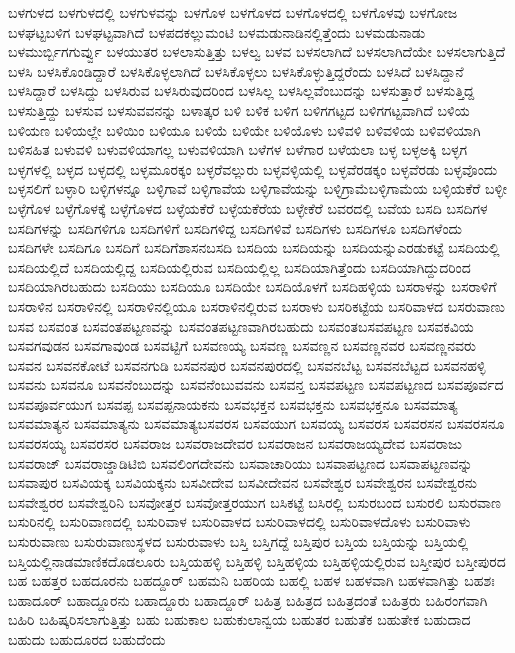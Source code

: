 {ಬಳಗುಳದ
ಬಳಗುಳದಲ್ಲಿ
ಬಳಗುಳವನ್ನು
ಬಳಗೊಳ
ಬಳಗೊಳದ
ಬಳಗೊಳದಲ್ಲಿ
ಬಳಗೊಳವು
ಬಳಗೋಜ
ಬಳಘಟ್ಟಬಳಿಗ
ಬಳಘಟ್ಟವಾಗಿದೆ
ಬಳಪದಕಲ್ಲುಮಂಟಿ
ಬಳಮಡುನಾಡಿನಲ್ಲಿತ್ತೆಂದು
ಬಳಮಡುನಾಡು
ಬಳಮುರ್ಬ್ಬಿಗಗುರ್ವ್ವು
ಬಳಯುತರ
ಬಳಲಾಸುತ್ತಿತ್ತು
ಬಳಲ್ವ
ಬಳವ
ಬಳಸಲಾಗಿದೆ
ಬಳಸಲಾಗಿದೆಯೇ
ಬಳಸಲಾಗುತ್ತಿದೆ
ಬಳಸಿ
ಬಳಸಿಕೊಂಡಿದ್ದಾರೆ
ಬಳಸಿಕೊಳ್ಳಲಾಗಿದೆ
ಬಳಸಿಕೊಳ್ಳಲು
ಬಳಸಿಕೊಳ್ಳುತ್ತಿದ್ದರೆಂದು
ಬಳಸಿದೆ
ಬಳಸಿದ್ದಾನೆ
ಬಳಸಿದ್ದಾರೆ
ಬಳಸಿದ್ದು
ಬಳಸಿರುವ
ಬಳಸಿರುವುದರಿಂದ
ಬಳಸಿಲ್ಲ
ಬಳಸಿಲ್ಲವೆಂಬುದನ್ನು
ಬಳಸುತ್ತಾರೆ
ಬಳಸುತ್ತಿದ್ದ
ಬಳಸುತ್ತಿದ್ದು
ಬಳಸುವ
ಬಳಸುವವನನ್ನು
ಬಳಾತ್ಕರ
ಬಳಿ
ಬಳಿಕ
ಬಳಿಗ
ಬಳಿಗಗಟ್ಟದ
ಬಳಿಗಗಟ್ಟವಾಗಿದೆ
ಬಳಿಯ
ಬಳಿಯಣ
ಬಳಿಯಲ್ಲೇ
ಬಳಿಯಿಂ
ಬಳಿಯೂ
ಬಳಿಯೆ
ಬಳಿಯೇ
ಬಳಿಯೊಳು
ಬಳಿವಳಿ
ಬಳಿವಳಿಯ
ಬಳಿವಳಿಯಾಗಿ
ಬಳಿಸಹಿತ
ಬಳುವಳಿ
ಬಳುವಳಿಯಾಗಲ್ಲ
ಬಳುವಳಿಯಾಗಿ
ಬಳೆಗಳ
ಬಳೆಗಾರ
ಬಳೆಯಲಾ
ಬಳ್ಳ
ಬಳ್ಳಅಕ್ಕಿ
ಬಳ್ಳಗ
ಬಳ್ಳಗಳಲ್ಲಿ
ಬಳ್ಳದ
ಬಳ್ಳದಲ್ಲಿ
ಬಳ್ಳಮೂರಕ್ಕಂ
ಬಳ್ಳರೆವಲ್ಲುರು
ಬಳ್ಳವಳ್ಳಿಯಲ್ಲಿ
ಬಳ್ಳವೆರಡಕ್ಕಂ
ಬಳ್ಳವೆರಡು
ಬಳ್ಳವೊಂದು
ಬಳ್ಳಸಲಿಗೆ
ಬಳ್ಳಾರಿ
ಬಳ್ಳಿಗಳನ್ನೂ
ಬಳ್ಳಿಗಾವೆ
ಬಳ್ಳಿಗಾವೆಯ
ಬಳ್ಳಿಗಾವೆಯನ್ನು
ಬಳ್ಳಿಗ್ರಾಮೆಬಳ್ಳಿಗಾಮೆಯ
ಬಳ್ಳಿಯಕೆರೆ
ಬಳ್ಳೀ
ಬಳ್ಳೆಗೊಳ
ಬಳ್ಳೆಗೊಳಕ್ಕೆ
ಬಳ್ಳೆಗೊಳದ
ಬಳ್ಳೆಯಕೆರೆ
ಬಳ್ಳೆಯಕೆರೆಯ
ಬಳ್ಳೇಕೆರೆ
ಬವರದಲ್ಲಿ
ಬವೆಯ
ಬಸದಿ
ಬಸದಿಗಳ
ಬಸದಿಗಳನ್ನು
ಬಸದಿಗಳಿಗೂ
ಬಸದಿಗಳಿಗೆ
ಬಸದಿಗಳಿದ್ದ
ಬಸದಿಗಳಿವೆ
ಬಸದಿಗಳು
ಬಸದಿಗಳೂ
ಬಸದಿಗಳೆಂದು
ಬಸದಿಗಳೇ
ಬಸದಿಗೂ
ಬಸದಿಗೆ
ಬಸದಿಗೆಶಾಸನಬಸದಿ
ಬಸದಿಯ
ಬಸದಿಯನ್ನು
ಬಸದಿಯನ್ನುಎರಡುಕಟ್ಟೆ
ಬಸದಿಯಲ್ಲಿ
ಬಸದಿಯಲ್ಲಿದೆ
ಬಸದಿಯಲ್ಲಿದ್ದ
ಬಸದಿಯಲ್ಲಿರುವ
ಬಸದಿಯಲ್ಲಿಲ್ಲ
ಬಸದಿಯಾಗಿತ್ತೆಂದು
ಬಸದಿಯಾಗಿದ್ದುದರಿಂದ
ಬಸದಿಯಾಗಿರಬಹುದು
ಬಸದಿಯು
ಬಸದಿಯೂ
ಬಸದಿಯೇ
ಬಸದಿಯೊಳಗೆ
ಬಸದಿಹಳ್ಳಿಯ
ಬಸರಾಳನ್ನು
ಬಸರಾಳಿಗೆ
ಬಸರಾಳಿನ
ಬಸರಾಳಿನಲ್ಲಿ
ಬಸರಾಳಿನಲ್ಲಿಯೂ
ಬಸರಾಳಿನಲ್ಲಿರುವ
ಬಸರಾಳು
ಬಸರಿಕಟ್ಟೆಯ
ಬಸರಿವಾಳದ
ಬಸರುವಾಣು
ಬಸವ
ಬಸವಂತ
ಬಸವಂತಪಟ್ಟಣವನ್ನು
ಬಸವಂತಪಟ್ಟಣವಾಗಿರಬಹುದು
ಬಸವಂತಬಸವಪಟ್ಟಣ
ಬಸವಕವಿಯ
ಬಸವಗವುಡನ
ಬಸವಗಾವುಂಡ
ಬಸವಟ್ಟಿಗೆ
ಬಸವಣಯ್ಯ
ಬಸವಣ್ಣ
ಬಸವಣ್ಣನ
ಬಸವಣ್ಣನವರ
ಬಸವಣ್ಣನವರು
ಬಸವನ
ಬಸವನಕೋಟೆ
ಬಸವನಗುಡಿ
ಬಸವನಪುರ
ಬಸವನಪುರದಲ್ಲಿ
ಬಸವನಬೆಟ್ಟ
ಬಸವನಬೆಟ್ಟದ
ಬಸವನಹಳ್ಳಿ
ಬಸವನು
ಬಸವನೂ
ಬಸವನೆಂಬುದನ್ನು
ಬಸವನೆಂಬುವವನು
ಬಸವನ್ತ
ಬಸವಪಟ್ಟಣ
ಬಸವಪಟ್ಟಣದ
ಬಸವಪೂರ್ವದ
ಬಸವಪೂರ್ವಯುಗ
ಬಸವಪ್ಪ
ಬಸವಪ್ಪನಾಯಕನು
ಬಸವಭಕ್ತನ
ಬಸವಭಕ್ತನು
ಬಸವಭಕ್ತನೂ
ಬಸವಮಾತ್ಯ
ಬಸವಮಾತ್ಯನ
ಬಸವಮಾತ್ಯನು
ಬಸವಮಾತ್ಯಬಸವರಸ
ಬಸವಯುಗ
ಬಸವಯ್ಯ
ಬಸವರಸ
ಬಸವರಸನ
ಬಸವರಸನೂ
ಬಸವರಸಯ್ಯ
ಬಸವರಸರ
ಬಸವರಾಜ
ಬಸವರಾಜದೇವರ
ಬಸವರಾಜನ
ಬಸವರಾಜಯ್ಯದೇವ
ಬಸವರಾಜು
ಬಸವರಾಜ್
ಬಸವರಾಜ್ಡಾಡಿಟಿಬಿ
ಬಸವಲಿಂಗದೇವನು
ಬಸವಾಚಾರಿಯು
ಬಸವಾಪಟ್ಟಣದ
ಬಸವಾಪಟ್ಟಣವನ್ನು
ಬಸವಾಪುರ
ಬಸವಿಯಕ್ಕ
ಬಸವಿಯಕ್ಕನು
ಬಸವೀದೇವ
ಬಸವೀದೇವನ
ಬಸವೇಶ್ವರ
ಬಸವೇಶ್ವರನ
ಬಸವೇಶ್ವರನು
ಬಸವೇಶ್ವರರ
ಬಸವೇಶ್ವರಿನಿ
ಬಸವೋತ್ತರ
ಬಸವೋತ್ತರಯುಗ
ಬಸಿಕಟ್ಟೆ
ಬಸಿರಲ್ಲಿ
ಬಸುರಬಂದ
ಬಸುರಲಿ
ಬಸುರವಾಣ
ಬಸುರಿನಲ್ಲಿ
ಬಸುರಿವಾಣದಲ್ಲಿ
ಬಸುರಿವಾಳ
ಬಸುರಿವಾಳದ
ಬಸುರಿವಾಳದಲ್ಲಿ
ಬಸುರಿವಾಳದೊಳು
ಬಸುರಿವಾಳು
ಬಸುರುವಾಣು
ಬಸುರುವಾಣುಸ್ಥಳದ
ಬಸುರುವಾಳು
ಬಸ್ತಿ
ಬಸ್ತಿಗದ್ದೆ
ಬಸ್ತಿಪುರ
ಬಸ್ತಿಯ
ಬಸ್ತಿಯನ್ನು
ಬಸ್ತಿಯಲ್ಲಿ
ಬಸ್ತಿಯಲ್ಲಿನಾಡಮಾಣಿಕದೊಡಲೂರು
ಬಸ್ತಿಯಹಳ್ಳಿ
ಬಸ್ತಿಹಳ್ಳಿ
ಬಸ್ತಿಹಳ್ಳಿಯ
ಬಸ್ತಿಹಳ್ಳಿಯಲ್ಲಿರುವ
ಬಸ್ತೀಪುರ
ಬಸ್ತೀಪುರದ
ಬಹ
ಬಹತ್ತರ
ಬಹದೂರನು
ಬಹದ್ದೂರ್
ಬಹಮನಿ
ಬಹರಿಯ
ಬಹಲ್ಲಿ
ಬಹಳ
ಬಹಳವಾಗಿ
ಬಹಳವಾಗಿತ್ತು
ಬಹಶಃ
ಬಹಾದೂರ್
ಬಹಾದ್ದೂರನು
ಬಹಾದ್ದೂರು
ಬಹಾದ್ದೂರ್
ಬಹಿತ್ರ
ಬಹಿತ್ರದ
ಬಹಿತ್ರದಂತೆ
ಬಹಿತ್ರರು
ಬಹಿರಂಗವಾಗಿ
ಬಹಿರಿ
ಬಹಿಷ್ಕರಿಸಲಾಗುತ್ತಿತ್ತು
ಬಹು
ಬಹುಕಾಲ
ಬಹುಕುಲಾನ್ವಯ
ಬಹುತರ
ಬಹುತೆಕ
ಬಹುತೇಕ
ಬಹುದಾದ
ಬಹುದು
ಬಹುದೂರದ
ಬಹುದೆಂದು
}
